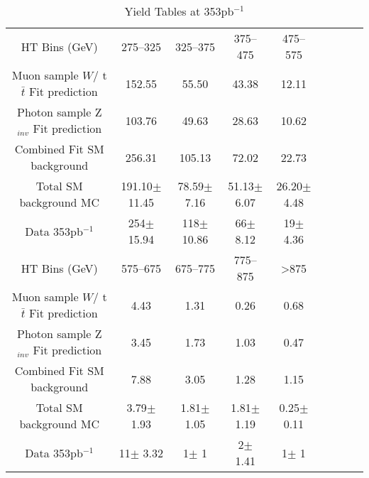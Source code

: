 \documentclass[english]{article}
\begin{document}
\begin{table}[ht]
\caption{Yield Tables at 353pb$^{-1}$} %
\centering
\begin{tabular}{ | c | c | c | c | c | c | c | c | c | } 
 \hline 
HT Bins (GeV) &275--325&325--375 &375--475& 475--575 \\  [0.5ex]
Muon sample $W$/ t$\bar{t}$ Fit prediction  &152.55& 55.50& 43.38& 12.11   \\
Photon sample  Z$_{inv}$ Fit prediction   &103.76&49.63&28.63&10.62 \\
Combined Fit SM background&256.31&105.13&72.02&22.73  \\
\hline \hline
Total SM background MC &191.10$\pm$ 11.45&78.59$\pm$ 7.16&51.13$\pm$ 6.07&26.20$\pm$ 4.48\\
\hline
Data 353pb$^{-1}$ &254$\pm$ 15.94& 118$\pm$ 10.86&66$\pm$ 8.12&19$\pm$ 4.36 \\
\hline \hline
\hline 

HT Bins (GeV) &575--675&675--775 &775--875& >875 \\  [0.5ex]
Muon sample $W$/ t$\bar{t}$ Fit prediction  & 4.43& 1.31&0.26&0.68   \\
Photon sample  Z$_{inv}$ Fit prediction   &3.45&1.73&1.03&0.47 \\
Combined Fit SM background&7.88&3.05&1.28&1.15  \\
\hline \hline
Total SM background MC &3.79$\pm$ 1.93&1.81$\pm$ 1.05&1.81$\pm$ 1.19&0.25$\pm$ 0.11\\
\hline
Data 353pb$^{-1}$ &11$\pm$ 3.32&1$\pm$ 1&2$\pm$ 1.41&1$\pm$ 1 \\
\hline \hline
\end{tabular}

\end{table}
\end{document}
